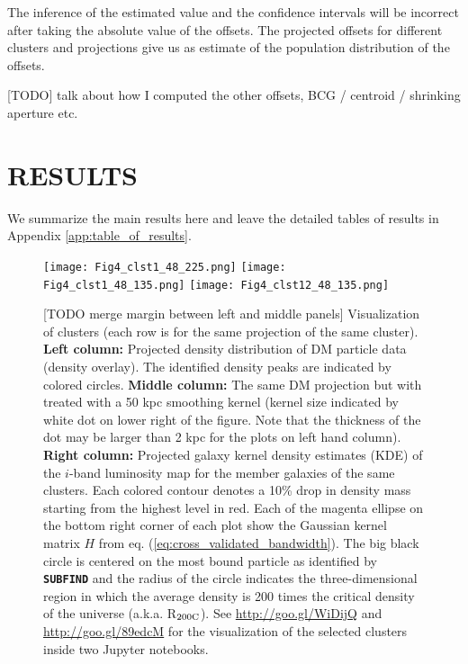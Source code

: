 The inference of the estimated value and the confidence intervals will be 
incorrect after taking the absolute value of the offsets.
The projected offsets for different clusters and projections give us as
estimate of the population distribution of the offsets.


[TODO] talk about how I computed the other offsets, BCG / centroid /
shrinking aperture etc.

\section{RESULTS} 
\label{sec:results}

We summarize the main results here and leave the detailed tables of results in 
Appendix \ref{app:table_of_results}.


\begin{figure*}
	\begin{center}
	\texttt{[image: Fig4\_clst1\_48\_225.png]}
	\texttt{[image: Fig4\_clst1\_48\_135.png]}
	\texttt{[image: Fig4\_clst12\_48\_135.png]}
	\caption{[TODO merge margin between left and middle panels] 
		Visualization of clusters (each row is for the same projection
		of the same cluster). {\bf Left column:} Projected density distribution of DM	
		particle data (density overlay). 
		The identified density peaks are indicated by colored circles. 
		{\bf Middle column:} The same DM projection but with treated with a 50 
		kpc smoothing kernel (kernel size indicated by white dot on lower right of
		the figure. Note that the thickness of the dot may be larger than 2 kpc
		for the plots on left hand column).
		{\bf Right column:} Projected galaxy kernel density estimates (KDE) of 
		the $i$-band luminosity map for the member
		galaxies of the same clusters. Each colored contour denotes a 10\% drop 
		in density mass starting from the highest level in red. Each of 
		the magenta ellipse on the
		bottom right corner of each plot show the Gaussian kernel matrix 
		$H$ from eq. (\ref{eq:cross_validated_bandwidth}). 
		The big black 
		circle is centered on the most bound particle as identified by {\bf
		\texttt{SUBFIND}} and the radius of the circle indicates the 
		three-dimensional region in
		which the average density is 200 times the critical density of the universe
		(a.k.a. R$_{\rm 200C}$).
		See \href{http://goo.gl/WiDijQ}{http://goo.gl/WiDijQ} 
		and \href{http://goo.gl/89edcM}{http://goo.gl/89edcM} for the 
		visualization of the selected clusters inside two Jupyter notebooks.
		\label{fig:select_peak_visualization}
	}
\end{center}
\end{figure*}



